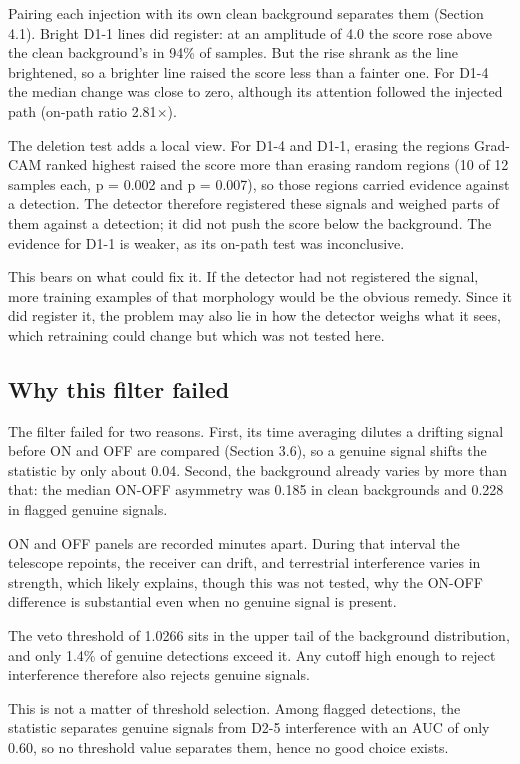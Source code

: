 \documentclass[11pt]{article}
\begin{document}
Pairing each injection with its own clean background separates them (Section 4.1). Bright D1-1 lines did register: at an amplitude of 4.0 the score rose above the clean background's in 94\% of samples. But the rise shrank as the line brightened, so a brighter line raised the score less than a fainter one. For D1-4 the median change was close to zero, although its attention followed the injected path (on-path ratio 2.81$\times$).

The deletion test adds a local view. For D1-4 and D1-1, erasing the regions Grad-CAM ranked highest raised the score more than erasing random regions (10 of 12 samples each, p = 0.002 and p = 0.007), so those regions carried evidence against a detection. The detector therefore registered these signals and weighed parts of them against a detection; it did not push the score below the background. The evidence for D1-1 is weaker, as its on-path test was inconclusive.

This bears on what could fix it. If the detector had not registered the signal, more training examples of that morphology would be the obvious remedy. Since it did register it, the problem may also lie in how the detector weighs what it sees, which retraining could change but which was not tested here.

\subsection{Why this filter failed}
The filter failed for two reasons. First, its time averaging dilutes a drifting signal before ON and OFF are compared (Section 3.6), so a genuine signal shifts the statistic by only about 0.04. Second, the background already varies by more than that: the median ON-OFF asymmetry was 0.185 in clean backgrounds and 0.228 in flagged genuine signals.

ON and OFF panels are recorded minutes apart. During that interval the telescope repoints, the receiver can drift, and terrestrial interference varies in strength, which likely explains, though this was not tested, why the ON-OFF difference is substantial even when no genuine signal is present.

The veto threshold of 1.0266 sits in the upper tail of the background distribution, and only 1.4\% of genuine detections exceed it. Any cutoff high enough to reject interference therefore also rejects genuine signals.

This is not a matter of threshold selection. Among flagged detections, the statistic separates genuine signals from D2-5 interference with an AUC of only 0.60, so no threshold value separates them, hence no good choice exists.
\end{document}
